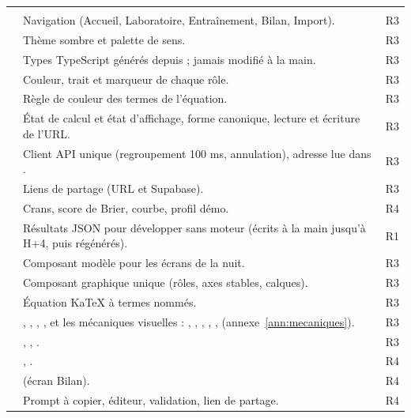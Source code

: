 \documentclass[11pt,a4paper]{article}
\begin{document}
\begin{appendices}
\begin{longtable}{@{}L{6.4cm} >{\raggedright\arraybackslash}p{\dimexpr\textwidth-7.9cm-4\tabcolsep\relax} L{1.5cm}@{}}
   \\
   & Navigation (Accueil, Laboratoire, Entraînement, Bilan, Import). & R3 \\
   & Thème sombre et palette de sens. & R3 \\
   & Types TypeScript générés depuis  ; jamais modifié à la main. & R3 \\
   & Couleur, trait et marqueur de chaque rôle. & R3 \\
   & Règle de couleur des termes de l'équation. & R3 \\
   & État de calcul et état d'affichage, forme canonique, lecture et écriture de l'URL. & R3 \\
   & Client API unique (regroupement 100 ms, annulation), adresse lue dans . & R3 \\
   & Liens de partage (URL et Supabase). & R3 \\
   & Crans, score de Brier, courbe, profil démo. & R4 \\
   & Résultats JSON pour développer sans moteur (écrits à la main jusqu'à H+4, puis régénérés). & R1 \\
   & Composant modèle pour les écrans de la nuit. & R3 \\
   & Composant graphique unique (rôles, axes stables, calques). & R3 \\
   & Équation KaTeX à termes nommés. & R3 \\
   & , , , , et les mécaniques visuelles : , , , , ,  (annexe~\ref{ann:mecaniques}). & R3 \\
   & , , . & R3 \\
   & , . & R4 \\
   &  (écran Bilan). & R4 \\
   & Prompt à copier, éditeur, validation, lien de partage. & R4 \\


\end{longtable}
\end{appendices}
\end{document}
